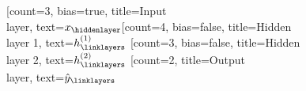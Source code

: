 \documentclass{standalone}
\begin{document}
	\begin{neuralnetwork}[height=4]
		\newcommand{\x}[2]{$x_#2$}
		\newcommand{\y}[2]{$\hat{y}_#2$}
		\newcommand{\hfirst}[2]{\small $h^{(1)}_#2$}
		\newcommand{\hsecond}[2]{\small $h^{(2)}_#2$}
		[count=3, bias=true, title=Input\\layer, text=\x]
		\hiddenlayer[count=4, bias=false, title=Hidden\\layer 1, text=\hfirst] \linklayers
		\hiddenlayer[count=3, bias=false, title=Hidden\\layer 2, text=\hsecond] \linklayers
		\outputlayer[count=2, title=Output\\layer, text=\y] \linklayers
	\end{neuralnetwork}
\end{document}
